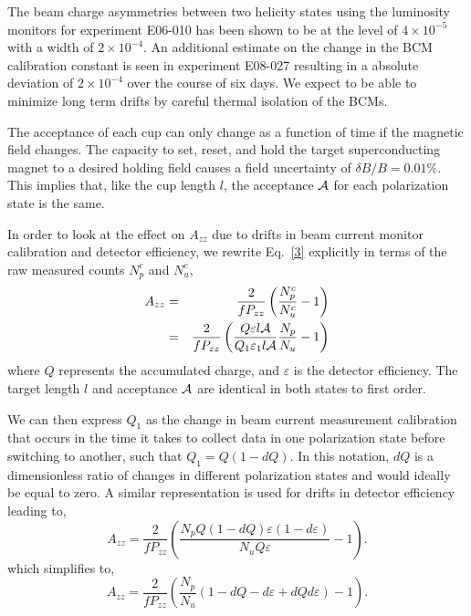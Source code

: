 The beam charge asymmetries between two helicity states using the luminosity monitors for experiment
E06-010 has been shown to be at the level of $4 \times 10^{-5}$ with a width of $2 \times 10^{-4}$.
An additional estimate on the change in the BCM calibration constant is seen in
experiment E08-027 resulting in a absolute deviation of $2 \times 10^{-4}$ over the course of six
days. We expect to be able to minimize long term drifts by careful thermal isolation of
the BCMs.

The acceptance of each cup can only change as a function of time if the magnetic field changes.  
The capacity to set, reset, and hold the target superconducting magnet to a desired holding field causes a field uncertainty of $\delta B /B=0.01\%$. 
This implies that, like the cup length $l$, the acceptance ${\cal A}$ for each polarization state is the same.

In order to look at the effect on $A_{zz}$ due to drifts in beam current monitor calibration and detector efficiency, we rewrite Eq.~\ref{3} explicitly in terms of the raw measured counts $N_p^c$ and $N_u^c$,
\begin{eqnarray} \label{3c}
\nonumber
A_{zz}&=&\frac{2}{fP_{zz}}\left(\frac{N^c_p}{N^c_u}-1\right) \\
      &=&\frac{2}{fP_{zz}}\left(\frac{Q\varepsilon l \cal{A}}{Q_1\varepsilon_1 l \cal{A}}\frac{N_p}{N_u}-1\right)
\end{eqnarray}
where $Q$ represents the accumulated charge, and $\varepsilon$ is the detector efficiency. The target length $l$ and acceptance $\cal{A}$ are identical in both states to first order.

We can then express $Q_1$ as the change in beam current measurement calibration that occurs in
the time it takes to collect data in one polarization state before switching to another, such that $Q_1=Q(1-dQ)$.
In this notation, $dQ$ is a dimensionless ratio of changes in different polarization states and would ideally be equal to zero.  A similar representation
is used for drifts in detector efficiency leading to,
\begin{equation}
A_{zz}=\frac{2}{fP_{zz}}\left(\frac{N_pQ(1-dQ)\varepsilon(1-d\varepsilon)}{N_u Q\varepsilon}-1\right).
\end{equation}
which simplifies to,
\begin{equation}
A_{zz}=\frac{2}{fP_{zz}}\left(\frac{N_p}{N_u}(1-dQ-d\varepsilon+dQd\varepsilon)-1\right).
\end{equation}

